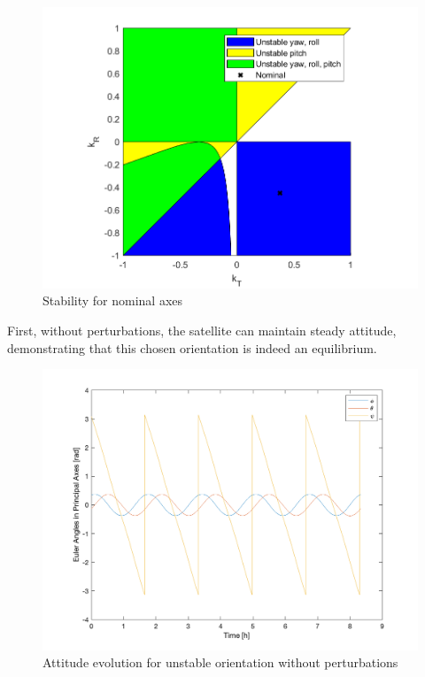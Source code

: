 \begin{figure}[H]
\centering
\includegraphics[scale=0.6]{Images/ps5_problem1a.png}
\caption{Stability for nominal axes}
\label{fig:ps5_problem1a}
\end{figure}

First, without perturbations, the satellite can maintain steady attitude, demonstrating that this chosen orientation is indeed an equilibrium.

\begin{figure}[H]
\centering
\includegraphics[scale=0.6]{Images/ps5_problem1b_angle_unperturbed.png}
\caption{Attitude evolution for unstable orientation without perturbations}
\label{fig:ps5_problem1b_angle_unperturbed}
\end{figure}

